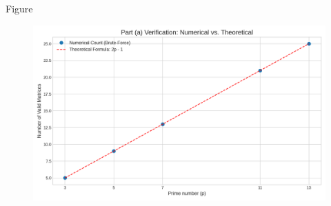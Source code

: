 \documentclass{beamer}
\begin{document}
\begin{frame}{Figure}
    \begin{figure}[H]
    \centering
    \includegraphics[width=\columnwidth]{figs/figure.png}
    \caption{}
    \label{fig:placeholder}
\end{figure}
\end{frame}
\end{document}
